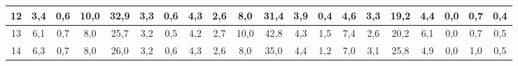 \begin{sidewaystable}[]
\begin{tabular}{|c|c|c|c|c|c|c|c|c|c|c|c|c|c|c|c|c|c|c|c|}
    12 & 3,4                                              & 0,6                                              & 10,0                                             & 32,9                                             & 3,3                                              & 0,6                                              & 4,3                                              & 2,6                                              & 8,0                                              & 31,4                                             & 3,9                                              & 0,4                                              & 4,6                                              & 3,3                                              & 19,2                                             & 4,4                                              & 0,0                                              & 0,7                                              & 0,4                                              \\ \hline
    13 & 6,1                                              & 0,7                                              & 8,0                                              & 25,7                                             & 3,2                                              & 0,5                                              & 4,2                                              & 2,7                                              & 10,0                                             & 42,8                                             & 4,3                                              & 1,5                                              & 7,4                                              & 2,6                                              & 20,2                                             & 6,1                                              & 0,0                                              & 0,7                                              & 0,5                                              \\ \hline
    14 & 6,3                                              & 0,7                                              & 8,0                                              & 26,0                                             & 3,2                                              & 0,6                                              & 4,3                                              & 2,6                                              & 8,0                                              & 35,0                                             & 4,4                                              & 1,2                                              & 7,0                                              & 3,1                                              & 25,8                                             & 4,9                                              & 0,0                                              & 1,0                                              & 0,5                                              \\ \hline

\end{tabular}
\end{sidewaystable}
